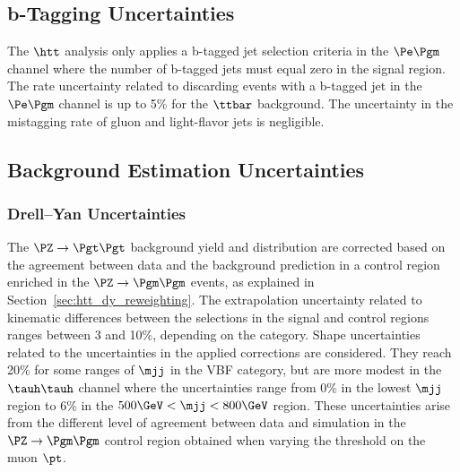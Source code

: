 \subsection{b-Tagging Uncertainties}
The $\htt$ analysis only applies a b-tagged jet selection criteria in the $\Pe\Pgm$ channel where the number
of b-tagged jets must equal zero in the signal region. The rate uncertainty related to discarding events 
with a b-tagged jet in the $\Pe\Pgm$ channel is up to 5\% for the $\ttbar$ background. The uncertainty 
in the mistagging rate of gluon and light-flavor jets is negligible.




\subsection{Background Estimation Uncertainties}
\subsubsection{Drell--Yan Uncertainties}
The $\PZ\to\Pgt\Pgt$ background yield and distribution are corrected based on the agreement between data and the 
background prediction in a control region enriched in the $\PZ\to\Pgm\Pgm$ events, as explained in 
Section~\ref{sec:htt_dy_reweighting}. The extrapolation uncertainty related to kinematic differences between the selections 
in the signal and control regions ranges between 3 and 10\%, depending
on the category. Shape uncertainties related to the uncertainties in the applied corrections are considered.
They reach 20\% for some ranges of $\mjj$ in the VBF category, but are more modest in the $\tauh\tauh$ channel where
the uncertainties range from 0\% in the lowest $\mjj$ region to 6\% in the $500\GeV < \mjj < 800\GeV$ region.
These uncertainties arise from the different level of agreement between data and simulation in the 
$\PZ\to\Pgm\Pgm$ control region obtained when varying the threshold on the muon $\pt$.


